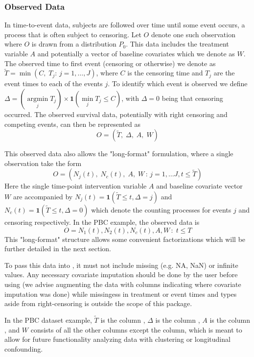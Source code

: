 \documentclass{report}
\DeclareMathOperator*{\argmin}{argmin}
\newcommand{\1}{\ensuremath{\mathbf{1}}}
\newcommand{\T}{\ensuremath{\widetilde{T}}}
\renewcommand{\L}{\ensuremath{W}}
\begin{document}
\subsubsection{Observed Data}
\label{ObservedData}
In time-to-event data, subjects are followed over time until some event occurs, a process that is often subject to censoring. Let \(O\) denote one such observation where \(O\) is drawn from a distribution \(P_0\). This data includes the treatment variable \(A\) and potentially a vector of baseline covariates which we denote as \(\L\). The observed time to first event (censoring or otherwise) we denote as \(\T = \min(C,\; T_j :\, j = 1, \dots, J)\), where \(C\) is the censoring time and \(T_j\) are the event times to each of the events \(j\). To identify which event is observed we define \(\Delta = (\argmin\limits_j T_j) \times \1(\min\limits_j T_j \leq C)\), with \(\Delta = 0\) being that censoring occurred. The observed survival data, potentially with right censoring and competing events, can then be represented as 
\[O = (\T,\;\Delta,\;A,\;\L)\]

This observed data also allows the "long-format" formulation, where a single observation take the form
\[O = (N_j(t),\;N_c(t),\;A,\;\L\,:\, j = 1, \dots J, t \leq \T)\]
Here the single time-point intervention variable \(A\) and baseline covariate vector \(\L\) are accompanied by \(N_j(t) = \1(\T \leq t, \Delta = j)\) and \(N_c(t) = \1(\T \leq t, \Delta = 0)\) which denote the counting processes for events \(j\) and censoring respectively. In the PBC example, the observed data is
\[ O = N_1(t), N_2(t), N_c(t), A, \L \,:\; t \leq T \]
This "long-format" structure allows some convenient factorizations which will be further detailed in the next section.

To pass this data into , it must not include missing (e.g. NA, NaN) or infinite values. Any necessary covariate imputation should be done by the user before using  (we advise augmenting the data with columns indicating where covariate imputation was done) while missingess in treatment or event times and types aside from right-censoring is outside the scope of this package.

In the PBC dataset example, \(\T\) is the column , \(\Delta\) is the column , \(A\) is the column , and \(\L\) consists of all the other columns except the  column, which is meant to allow for future functionality analyzing data with clustering or longitudinal confounding. 
\end{document}
